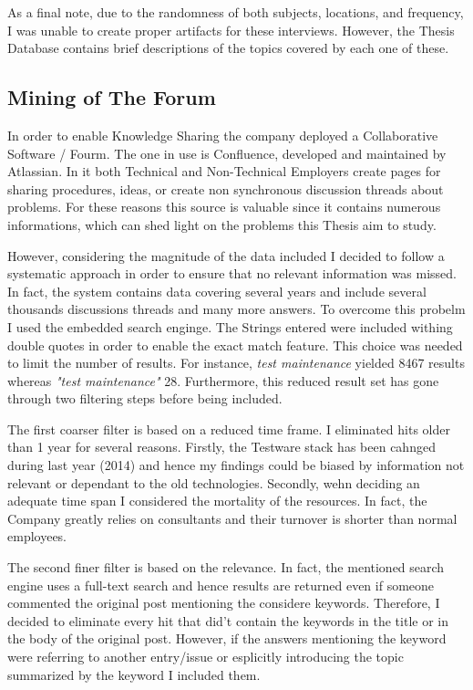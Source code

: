 As a final note, due to the randomness of both subjects, locations, and frequency, I was unable to create proper artifacts for these interviews. However, the Thesis Database contains brief descriptions of the topics covered by each one of these.

\subsection{Mining of The Forum} \label{mining_forum}
In order to enable Knowledge Sharing the company deployed a Collaborative Software / Fourm. The one in use is Confluence, developed and maintained by Atlassian. In it both Technical and Non-Technical Employers create pages for sharing procedures, ideas, or create non synchronous discussion threads about problems. For these reasons this source is valuable since it contains numerous informations, which can shed light on the problems this Thesis aim to study.

However, considering the magnitude of the data included I decided to follow a systematic approach in order to ensure that no relevant information was missed. In fact, the system contains data covering several years and include several thousands discussions threads and many more answers. To overcome this probelm I used the embedded search enginge. The Strings entered were included withing double quotes in order to enable the exact match feature. This choice was needed to limit the number of results. For instance, \textit{test maintenance} yielded 8467 results whereas \textit{"test maintenance"} 28. Furthermore, this reduced result set has gone through two filtering steps before being included.

The first coarser filter is based on a reduced time frame. I eliminated hits older than 1 year for several reasons. Firstly, the Testware stack has been cahnged during last year (2014) and hence my findings could be biased by information not relevant or dependant to the old technologies. Secondly, wehn deciding an adequate time span I considered the mortality of the resources. In fact, the Company greatly relies on consultants and their turnover is shorter than normal employees.

The second finer filter is based on the relevance. In fact, the mentioned search engine uses a full-text search and hence results are returned even if someone commented the original post mentioning the considere keywords. Therefore, I decided to eliminate every hit that did't contain the keywords in the title or in the body of the original post. However, if the answers mentioning the keyword were referring to another entry/issue or esplicitly introducing the topic summarized by the keyword I included them.

